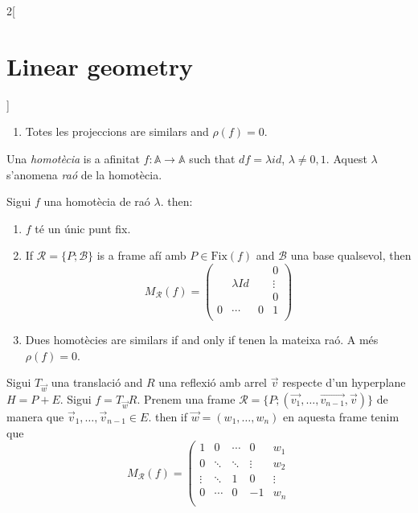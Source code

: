 \documentclass[class=article,10pt,crop=false]{standalone}
\begin{document}
\begin{multicols}{2}[\section{Linear geometry}]
\begin{prop}
\begin{enumerate}
$$\begin{array}{cccc|c}
    \hline
    0 & \cdots & 0 & 0 &  1\\
    \end{array}\right)$$
    \item Totes les projeccions are similars and $\rho(f)=0$.
\end{enumerate}
\end{prop}
\begin{definition}[Homotècies]
Una \textit{homotècia} is a afinitat $f:\mathbb{A}\rightarrow\mathbb{A}$ such that $df=\lambda id$, $\lambda\ne0,1$. Aquest $\lambda$ s'anomena \textit{raó} de la homotècia.
\end{definition}
\begin{prop}
Sigui $f$ una homotècia de raó $\lambda$. then:
\begin{enumerate}
    \item $f$ té un únic punt fix.
    \item If $\mathcal{R}=\{P;\mathcal{B}\}$ is a frame afí amb $P\in\text{Fix}(f)$ and $\mathcal{B}$ una base qualsevol, then $$M_\mathcal{R}(f)=\left(\begin{array}{ccc|c}
     & & & 0\\
    & \lambda Id & & \vdots\\
    & & & 0\\
    \hline
    0 & \cdots & 0 &  1\\
    \end{array}\right)$$
    \item Dues homotècies are similars if and only if tenen la mateixa raó. A més $\rho(f)=0$.
\end{enumerate}
\end{prop}
\begin{prop}
Sigui $T_{\overrightarrow{w}}$ una translació and $R$ una reflexió amb arrel $\overrightarrow{v}$ respecte d'un hyperplane $H=P+E$. Sigui $f=T_{\overrightarrow{w}}R$. Prenem una frame $\mathcal{R}=\{P;(\overrightarrow{v_1},\ldots,\overrightarrow{v_{n-1}},\overrightarrow{v})\}$ de manera que $\overrightarrow{v}_1,\ldots,\overrightarrow{v}_{n-1}\in E$. then if $\overrightarrow{w}=(w_1,\ldots,w_n)$ en aquesta frame tenim que
    $$M_\mathcal{R}(f)=\left(\begin{array}{cccc|c}
    1 & 0 & \cdots & 0 & w_1\\
    0 & \ddots & \ddots & \vdots & w_2\\
    \vdots & \ddots & 1 & 0 & \vdots\\
    0 & \cdots & 0 & -1 & w_n\\

\end{array}$$
\end{prop}
\end{multicols}
\end{document}
